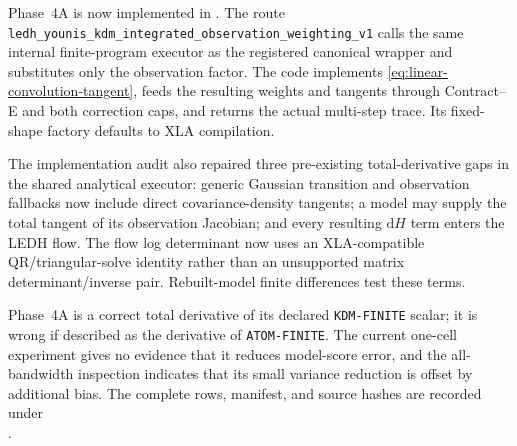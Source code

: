 \documentclass[11pt]{article}
\newcommand{\dd}{\mathrm{d}}
\begin{document}
Phase~4A is now implemented in
.  The route
\texttt{ledh\_younis\_kdm\_integrated\_observation\_weighting\_v1} calls the
same internal finite-program executor as the registered canonical wrapper and
substitutes only the observation factor.  The code implements
\eqref{eq:linear-convolution-tangent}, feeds the resulting weights and
tangents through Contract--E and both correction caps, and returns the actual
multi-step trace.  Its fixed-shape factory defaults to XLA compilation.

The implementation audit also repaired three pre-existing total-derivative
gaps in the shared analytical executor: generic Gaussian transition and
observation fallbacks now include direct covariance-density tangents; a model
may supply the total tangent of its observation Jacobian; and every resulting
$\dd H$ term enters the LEDH flow.  The flow log determinant now uses an
XLA-compatible QR/triangular-solve identity rather than an unsupported matrix
determinant/inverse pair.  Rebuilt-model finite differences test these terms.

Phase~4A is a correct total derivative of its declared
\texttt{KDM-FINITE} scalar; it is wrong if described as the derivative of
\texttt{ATOM-FINITE}.  The current one-cell experiment gives no evidence that
it reduces model-score error, and the all-bandwidth inspection indicates that
its small variance reduction is offset by additional bias.  The complete
rows, manifest, and source hashes are recorded under
\\
.
\end{document}
